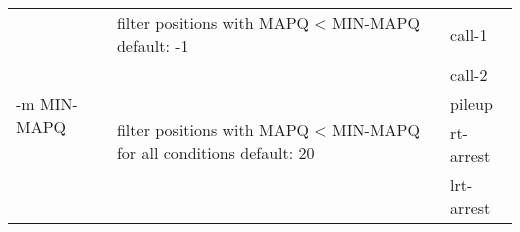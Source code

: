 {\small
\begin{tabular}{@{}p{}p{}l@{}}
\multirow{5}{=}{-m MIN-MAPQ} & filter positions with MAPQ < MIN-MAPQ
default: -1 & call-1 \\
 & \multirow{4}{=}{filter positions with MAPQ < MIN-MAPQ for all conditions
default: 20} & call-2 \\
 & & pileup \\
 & & rt-arrest \\
 & & lrt-arrest \\
\end{tabular}\\
}
